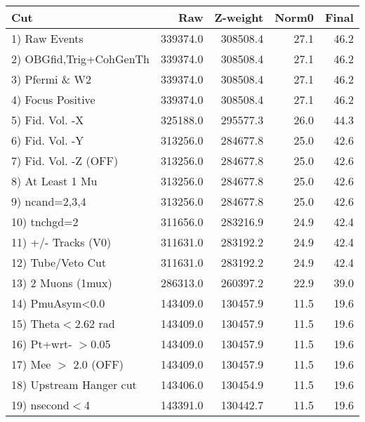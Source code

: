  \begin{table}[h!]\centering
 \begin{tabular}{||l||r|r|r|r||}
 \hline
 \hline
 Cut & Raw & Z-weight & Norm0 & Final \\
 \hline
  1) Raw Events           &    339374.0 &    308508.4 &        27.1 &        46.2 \\
  2) OBGfid,Trig+CohGenTh &    339374.0 &    308508.4 &        27.1 &        46.2 \\
  3) Pfermi \& W2         &    339374.0 &    308508.4 &        27.1 &        46.2 \\
  4) Focus Positive       &    339374.0 &    308508.4 &        27.1 &        46.2 \\
  5) Fid. Vol. -X         &    325188.0 &    295577.3 &        26.0 &        44.3 \\
  6) Fid. Vol. -Y         &    313256.0 &    284677.8 &        25.0 &        42.6 \\
  7) Fid. Vol. -Z (OFF)   &    313256.0 &    284677.8 &        25.0 &        42.6 \\
  8) At Least 1 Mu        &    313256.0 &    284677.8 &        25.0 &        42.6 \\
  9) ncand=2,3,4          &    313256.0 &    284677.8 &        25.0 &        42.6 \\
 10) tnchgd=2             &    311656.0 &    283216.9 &        24.9 &        42.4 \\
 11) +/- Tracks (V0)      &    311631.0 &    283192.2 &        24.9 &        42.4 \\
 12) Tube/Veto Cut        &    311631.0 &    283192.2 &        24.9 &        42.4 \\
 13) 2 Muons (1mux)       &    286313.0 &    260397.2 &        22.9 &        39.0 \\
 14) PmuAsym<0.0          &    143409.0 &    130457.9 &        11.5 &        19.6 \\
 15) Theta$<$2.62 rad     &    143409.0 &    130457.9 &        11.5 &        19.6 \\
 16) Pt+wrt- $>$0.05      &    143409.0 &    130457.9 &        11.5 &        19.6 \\
 17) Mee $>$ 2.0  (OFF)   &    143409.0 &    130457.9 &        11.5 &        19.6 \\
 18) Upstream Hanger cut  &    143406.0 &    130454.9 &        11.5 &        19.6 \\
 19) nsecond$<$4          &    143391.0 &    130442.7 &        11.5 &        19.6 \\

\end{tabular}
\end{table}

